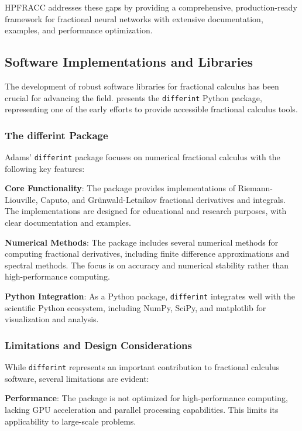 HPFRACC addresses these gaps by providing a comprehensive, production-ready framework for fractional neural networks with extensive documentation, examples, and performance optimization.

\subsection{Software Implementations and Libraries}

The development of robust software libraries for fractional calculus has been crucial for advancing the field. \citet{Adams2019DifferintPythonPackage} presents the \texttt{differint} Python package, representing one of the early efforts to provide accessible fractional calculus tools.

\subsubsection{The differint Package}

Adams' \texttt{differint} package focuses on numerical fractional calculus with the following key features:

\textbf{Core Functionality}: The package provides implementations of Riemann-Liouville, Caputo, and Grünwald-Letnikov fractional derivatives and integrals. The implementations are designed for educational and research purposes, with clear documentation and examples.

\textbf{Numerical Methods}: The package includes several numerical methods for computing fractional derivatives, including finite difference approximations and spectral methods. The focus is on accuracy and numerical stability rather than high-performance computing.

\textbf{Python Integration}: As a Python package, \texttt{differint} integrates well with the scientific Python ecosystem, including NumPy, SciPy, and matplotlib for visualization and analysis.

\subsubsection{Limitations and Design Considerations}

While \texttt{differint} represents an important contribution to fractional calculus software, several limitations are evident:

\textbf{Performance}: The package is not optimized for high-performance computing, lacking GPU acceleration and parallel processing capabilities. This limits its applicability to large-scale problems.

